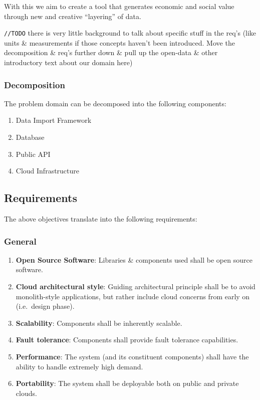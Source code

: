 With this we aim to create a tool that generates economic and social
value through new and creative ``layering'' of data.

\texttt{//TODO} there is very little background to talk about specific
stuff in the req's (like units \& measurements if those concepts haven't
been introduced. Move the decomposition \& req's further down \& pull up
the open-data \& other introductory text about our domain here)

\subsubsection{Decomposition}\label{decomposition}

The problem domain can be decomposed into the following components:

\begin{enumerate}
\def\labelenumi{\arabic{enumi}.}
\tightlist
\item
  Data Import Framework
\item
  Database
\item
  Public API
\item
  Cloud Infrastructure
\end{enumerate}

\subsection{Requirements}\label{requirements}

The above objectives translate into the following requirements:

\subsubsection{General}\label{general}

\begin{enumerate}
\def\labelenumi{\arabic{enumi}.}
\tightlist
\item
  \textbf{Open Source Software}: Libraries \& components used shall be
  open source software.
\item
  \textbf{Cloud architectural style}: Guiding architectural principle
  shall be to avoid monolith-style applications, but rather include
  cloud concerns from early on (i.e.~design phase).
\item
  \textbf{Scalability}: Components shall be inherently scalable.
\item
  \textbf{Fault tolerance}: Components shall provide fault tolerance
  capabilities.
\item
  \textbf{Performance}: The system (and its constituent components)
  shall have the ability to handle extremely high demand.
\item
  \textbf{Portability}: The system shall be deployable both on public
  and private clouds.
\end{enumerate}

